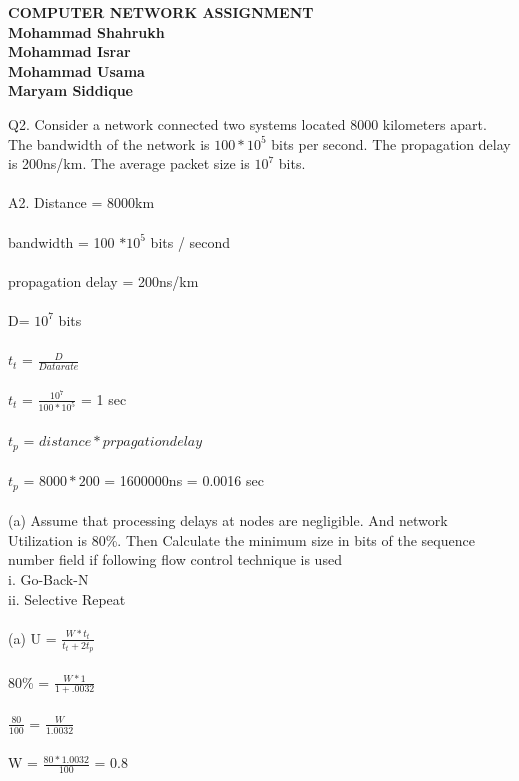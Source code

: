 \documentclass[a4paper,12pt]{article}
\begin{document}
\newpage
\begin{center}
\textcolor[rgb]{1.00,0.00,0.00}{\Large{\textbf{COMPUTER NETWORK ASSIGNMENT}}}\\
{\textbf{Mohammad Shahrukh }}\\
{\textbf{Mohammad Israr }}\\
{\textbf{Mohammad Usama }}\\
{\textbf{Maryam Siddique }}\\
\end{center}
\newpage
Q2. Consider a network connected two systems located 8000 kilometers apart. The bandwidth
of the network is $100 * 10^5$ bits per second. The propagation delay is 200ns/km. The
average packet size is $10^7$ bits.\\\\
A2. Distance = 8000km\\\\
 bandwidth = 100 $* 10^5$ bits / second \\\\
 propagation delay = 200ns/km\\\\
 D= $10^7$ bits\\\\
  
 $t_{t}$ = $\frac{D}{Data rate}$\\\\
 $t_{t}$ = $\frac{10^7}{ 100 * 10^5}$ = 1 sec\\\\
 $t_{p}$ = $ distance * prpagation delay $ \\\\
 $t_{p}$ = $ 8000 * 200 $  = 1600000ns = 0.0016 sec\\\\
(a) Assume that processing delays at nodes are negligible. And network Utilization is
80\%.
Then Calculate the minimum size in bits of the sequence number field if
following flow control technique is used\\
i. Go-Back-N\\
ii. Selective Repeat\\\\

 (a) U = $\frac{W* t_{t}}{t_{t}+2t_{p}}$ \\\\
  80\% =  $\frac{W* 1}{1 + .0032}$\\\\
  $\frac{80}{100}$ = $\frac{W}{1.0032}$\\\\
  W = $\frac{80*1.0032}{100}$ = 0.8\\\\
\end{document}
